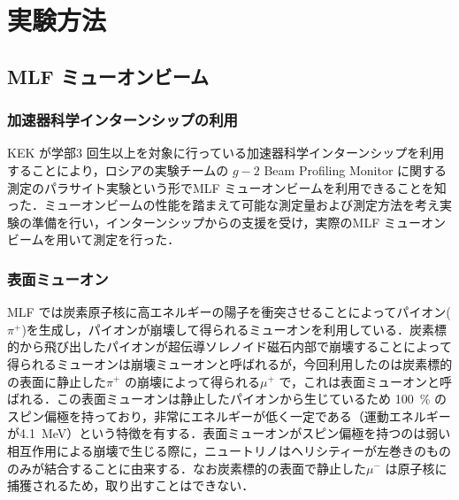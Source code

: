 



%


\section{実験方法}

\subsection{MLF ミューオンビーム}

\subsubsection{加速器科学インターンシップの利用}
KEK が学部3 回生以上を対象に行っている加速器科学インターンシップを利用することにより，ロシアの実験チームの $g - 2$ Beam Profiling Monitor に関する測定のパラサイト実験という形でMLF ミューオンビームを利用できることを知った．ミューオンビームの性能を踏まえて可能な測定量および測定方法を考え実験の準備を行い，インターンシップからの支援を受け，実際のMLF ミューオンビームを用いて測定を行った．

 \subsubsection{表面ミューオン}
 MLF では炭素原子核に高エネルギーの陽子を衝突させることによってパイオン($\pi^{+}$)を生成し，パイオンが崩壊して得られるミューオンを利用している．炭素標的から飛び出したパイオンが超伝導ソレノイド磁石内部で崩壊することによって得られるミューオンは崩壊ミューオンと呼ばれるが，今回利用したのは炭素標的の表面に静止した$\pi^{+}$ の崩壊によって得られる$\mu ^{+}$ で，これは表面ミューオンと呼ばれる．この表面ミューオンは静止したパイオンから生じているため 100~\% のスピン偏極を持っており，非常にエネルギーが低く一定である（運動エネルギーが4.1~MeV）という特徴を有する．表面ミューオンがスピン偏極を持つのは弱い相互作用による崩壊で生じる際に，ニュートリノはヘリシティーが左巻きのもののみが結合することに由来する．なお炭素標的の表面で静止した$\mu^-$ は原子核に捕獲されるため，取り出すことはできない．

